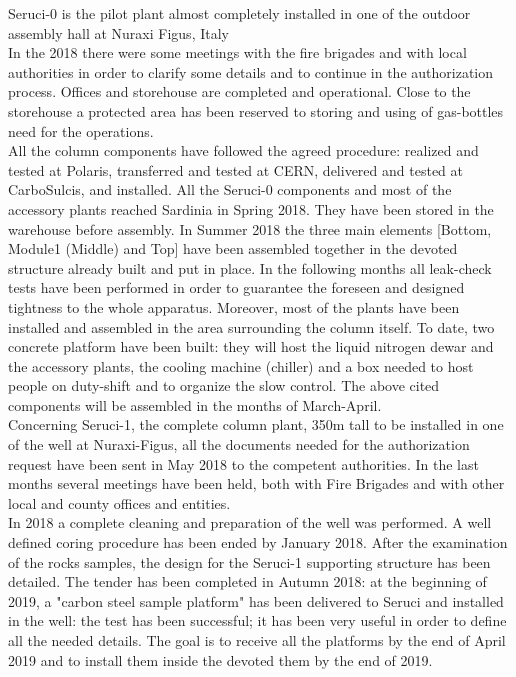 Seruci-0 is the pilot plant almost  completely installed  in one of the outdoor assembly hall at Nuraxi Figus, Italy\\
In the 2018 there were some meetings with the fire brigades and with local authorities in order to clarify some details and to continue in the authorization process.
Offices and storehouse are completed and operational.
Close to the storehouse a protected area has been reserved to storing and using of gas-bottles need for the operations.\\
All the column components have followed the agreed procedure: realized and tested at Polaris, transferred and tested at CERN, delivered and  tested at CarboSulcis, and installed.
All the Seruci-0 components and most of the accessory plants reached Sardinia in Spring 2018. They have been stored in the warehouse before assembly. In Summer 2018 the three main elements [Bottom, Module1 (Middle) and Top] have been assembled together in the devoted structure already built and put in place.
In the following months all leak-check tests have been performed in order to guarantee the foreseen and designed tightness to the whole apparatus. Moreover, most of the plants have been installed and assembled in the area surrounding the column itself.
To date, two concrete platform have been built: they will host the liquid nitrogen dewar and the  accessory plants, the cooling machine (chiller) and a box needed to host people on duty-shift and to organize the slow control.
The above cited components will be assembled in the months of March-April.\\
Concerning Seruci-1, the complete column plant, 350m tall to be installed in one of the well at Nuraxi-Figus, all the documents  needed for the authorization request have been sent in May 2018 to the competent authorities. In the last months several meetings have been held, both with Fire Brigades and with other local and county offices and entities.\\
In 2018 a complete cleaning and preparation of the well was  performed.
A well defined coring procedure has been ended by January 2018. After the examination of the rocks samples, the design for the Seruci-1 supporting structure has been detailed. The tender has been completed in Autumn 2018: at the beginning of 2019, a "carbon steel sample platform" has been delivered to Seruci and installed in the well: the test has been successful; it has been very useful in order to define all the needed details. The goal is to receive all the platforms by the end of April 2019 and to install them inside the devoted them by the end of 2019.\\
